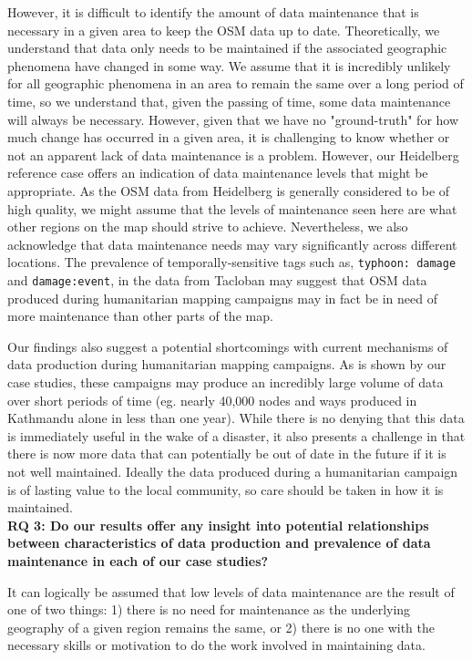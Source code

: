 However, it is difficult to identify the amount of data maintenance that is necessary in a given area to keep the OSM data up to date. Theoretically, we understand that data only needs to be maintained if the associated geographic phenomena have changed in some way. We assume that it is incredibly unlikely for all geographic phenomena in an area to remain the same over a long period of time, so we understand that, given the passing of time, some data maintenance will always be necessary. However, given that we have no "ground-truth" for how much change has occurred in a given area, it is challenging to know whether or not an apparent lack of data maintenance is a problem. However, our Heidelberg reference case offers an indication of data maintenance levels that might be appropriate. As the OSM data from Heidelberg is generally considered to be of high quality, we might assume that the levels of maintenance seen here are what other regions on the map should strive to achieve. Nevertheless, we also acknowledge that data maintenance needs may vary significantly across different locations. The prevalence of temporally-sensitive tags such as, \texttt{typhoon: damage} and \texttt{damage:event}, in the data from Tacloban may suggest that OSM data produced during humanitarian mapping campaigns may in fact be in need of more maintenance than other parts of the map.

Our findings also suggest a potential shortcomings with current mechanisms of data production during humanitarian mapping campaigns. As is shown by our case studies, these campaigns may produce an incredibly large volume of data over short periods of time (eg. nearly 40,000 nodes and ways produced in Kathmandu alone in less than one year). While there is no denying that this data is immediately useful in the wake of a disaster, it also presents a challenge in that there is now more data that can potentially be out of date in the future if it is not well maintained. Ideally the data produced during a humanitarian campaign is of lasting value to the local community, so care should be taken in how it is maintained. \\

\noindent\textbf{RQ 3: Do our results offer any insight into potential relationships between characteristics of data production and prevalence of data maintenance in each of our case studies?}

It can logically be assumed that low levels of data maintenance are the result of one of two things: 1) there is no need for maintenance as the underlying geography of a given region remains the same, or 2) there is no one with the necessary skills or motivation to do the work involved in maintaining data. 

